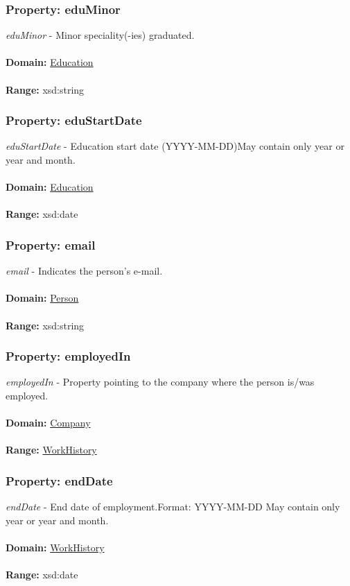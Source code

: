\documentclass[a4paper,12pt]{article}
\numberwithin{equation}{section}
\begin{document}
\subsubsection{Property: eduMinor}\hypertarget{eduMinor}{}
\textit{eduMinor} - Minor speciality(-ies) graduated.
\\\\
\textbf{Domain:} \hyperlink{Education}{Education} 
\\\\
\textbf{Range:}  xsd:string

\subsubsection{Property: eduStartDate}\hypertarget{eduStartDate}{}
\textit{eduStartDate} - Education start date (YYYY-MM-DD)May contain only year or year and month.
\\\\
\textbf{Domain:} \hyperlink{Education}{Education} 
\\\\
\textbf{Range:}  xsd:date

\subsubsection{Property: email}\hypertarget{email}{}
\textit{email} - Indicates the person's e-mail.
\\\\
\textbf{Domain:} \hyperlink{Person}{Person} 
\\\\
\textbf{Range:}  xsd:string

\subsubsection{Property: employedIn}\hypertarget{employedIn}{}
\textit{employedIn} - Property pointing to the company where the person is/was employed.
\\\\
\textbf{Domain:} \hyperlink{Company}{Company} 
\\\\
\textbf{Range:}  \hyperlink{WorkHistory}{WorkHistory} 

\subsubsection{Property: endDate}\hypertarget{endDate}{}
\textit{endDate} - End date of employment.Format: YYYY-MM-DD May contain only year or year and month.
\\\\
\textbf{Domain:} \hyperlink{WorkHistory}{WorkHistory} 
\\\\
\textbf{Range:}  xsd:date 
\end{document}
